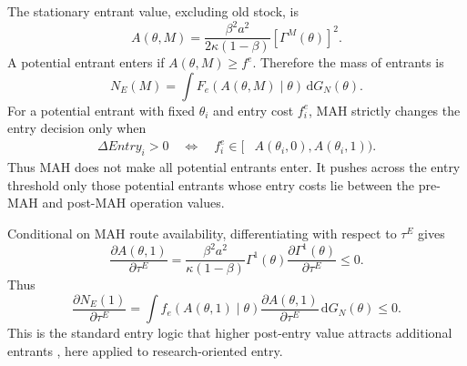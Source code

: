 \documentclass[12pt]{article}
\newcommand{\1}{\mathbf{1}}
\newcommand{\dd}{\mathrm{d}}
\begin{document}
The stationary entrant value, excluding old stock, is
\begin{equation}
    A(\theta,M)
    =
    \frac{\beta^2 a^2}{2\kappa(1-\beta)}
    \left[\Gamma^M(\theta)\right]^2.
    \label{eq:entrant_value}
\end{equation}
A potential entrant enters if $A(\theta,M)\ge f^e$. Therefore the mass of entrants is
\begin{equation}
    N_E(M)=
    \int
    F_e\!\left(A(\theta,M)\mid\theta\right)
    \,\dd G_N(\theta).
    \label{eq:entrymass}
\end{equation}
For a potential entrant with fixed $\theta_i$ and entry cost $f_i^e$, MAH strictly changes the entry decision only when
\begin{align}
    \Delta Entry_i>0
    \quad\Longleftrightarrow\quad
    f_i^e
    \in
    [&A(\theta_i,0),A(\theta_i,1)).
    \label{eq:entry_threshold}
\end{align}
Thus MAH does not make all potential entrants enter. It pushes across the entry threshold only those potential entrants whose entry costs lie between the pre-MAH and post-MAH operation values.

Conditional on MAH route availability, differentiating with respect to $\tau^E$ gives
\begin{equation}
    \frac{\partial A(\theta,1)}{\partial \tau^E}
    =
    \frac{\beta^2 a^2}{\kappa(1-\beta)}
    \Gamma^1(\theta)
    \frac{\partial\Gamma^1(\theta)}{\partial\tau^E}
    \le0.
    \label{eq:dAdtau}
\end{equation}
Thus
\begin{equation}
    \frac{\partial N_E(1)}{\partial \tau^E}
    =
    \int
    f_e\!\left(A(\theta,1)\mid\theta\right)
    \frac{\partial A(\theta,1)}{\partial\tau^E}
    \,\dd G_N(\theta)
    \le0.
    \label{eq:dEntrydtau}
\end{equation}
This is the standard entry logic that higher post-entry value attracts additional entrants \citep{BresnahanReiss1991,Berry1992}, here applied to research-oriented entry.
\end{document}
